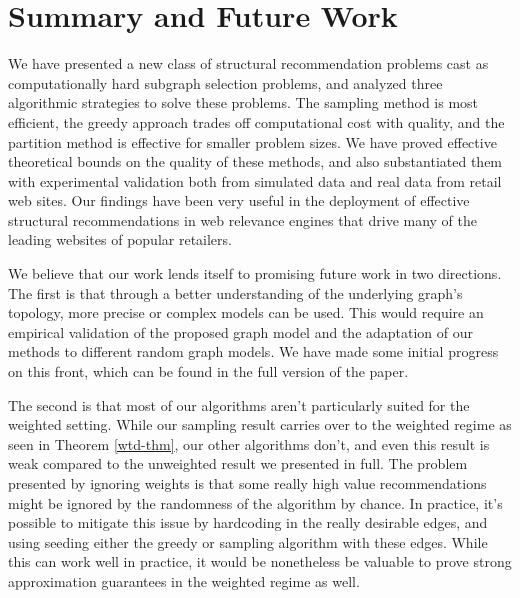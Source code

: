 \vspace{-0.1in}
\section{Summary and Future Work}
We have presented a new class of structural recommendation problems
cast as computationally hard subgraph selection problems, and analyzed three algorithmic
strategies to solve these problems.
The sampling method is most
efficient, the greedy approach trades off computational cost with
quality, and the partition method is effective for smaller problem
sizes. We have proved effective theoretical bounds on the quality
of these methods, and also substantiated them with experimental
validation both from simulated data and real data from
retail web sites. Our findings have been very useful in the
deployment of effective structural recommendations in web relevance
engines that drive many of the leading websites of popular retailers.

We believe that our work lends itself to promising future work in two directions.
The first is that through a better understanding of the underlying graph's topology,
more precise or complex models can be used. This would require an empirical validation of
the proposed graph model and the adaptation of our methods to different random graph models.
We have made some initial progress on this front, which can be found in the full version of the paper.

The second is that most of our algorithms aren't particularly suited for the weighted setting. While our sampling result carries over to the weighted regime as seen in Theorem \ref{wtd-thm}, our other algorithms don't, and even this result is weak compared to the unweighted result we presented in full. The problem presented by ignoring weights is that some really high value recommendations might be ignored by the randomness of the algorithm by chance. In practice, it's possible to mitigate this issue by hardcoding in the really desirable edges, and using seeding either the greedy or sampling algorithm with these edges. While this can work well in practice, it would be nonetheless be valuable to prove strong approximation guarantees in the weighted regime as well. \vs

